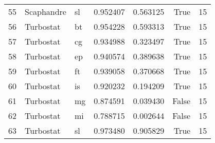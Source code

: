 \begin{tabular}{lllrrrr}
55 & Scaphandre & sl & 0.952407 & 0.563125 & True & 15 \\
56 & Turbostat & bt & 0.954228 & 0.593313 & True & 15 \\
57 & Turbostat & cg & 0.934988 & 0.323497 & True & 15 \\
58 & Turbostat & ep & 0.940574 & 0.389638 & True & 15 \\
59 & Turbostat & ft & 0.939058 & 0.370668 & True & 15 \\
60 & Turbostat & is & 0.920232 & 0.194209 & True & 15 \\
61 & Turbostat & mg & 0.874591 & 0.039430 & False & 15 \\
62 & Turbostat & mi & 0.788715 & 0.002644 & False & 15 \\
63 & Turbostat & sl & 0.973480 & 0.905829 & True & 15 \\
\bottomrule
\end{tabular}

